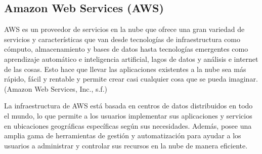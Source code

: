 \subsection{Amazon Web Services (AWS)}
AWS es un proveedor de servicios en la nube que ofrece una gran variedad de servicios y características que van desde tecnologías de infraestructura como cómputo, almacenamiento y bases de datos hasta tecnologías emergentes como aprendizaje automático e inteligencia artificial, lagos de datos y análisis e internet de las cosas. Esto hace que llevar las aplicaciones existentes a la nube sea más rápido, fácil y rentable y permite crear casi cualquier cosa que se pueda imaginar. (Amazon Web Services, Inc., s.f.)

La infraestructura de AWS está basada en centros de datos distribuidos en todo el mundo, lo que permite a los usuarios implementar sus aplicaciones y servicios en ubicaciones geográficas específicas según sus necesidades. Además, posee una amplia gama de herramientas de gestión y automatización para ayudar a los usuarios a administrar y controlar sus recursos en la nube de manera eficiente.
    